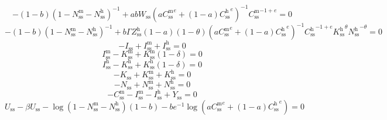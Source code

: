 \begin{equation}
-\left(1 - b\right) \left(1 - N^{\mathrm{m}}_\mathrm{ss} - N^{\mathrm{h}}_\mathrm{ss}\right)^{-1} + {a} {b} {W_\mathrm{ss}} \left({a} {{C^{\mathrm{m}}_\mathrm{ss}}^{e}} + \left(1 - a\right) {{C^{\mathrm{h}}_\mathrm{ss}}^{e}}\right)^{-1} {{C^{\mathrm{m}}_\mathrm{ss}}^{-1 + e}} = 0
\end{equation}
\begin{equation}
-\left(1 - b\right) \left(1 - N^{\mathrm{m}}_\mathrm{ss} - N^{\mathrm{h}}_\mathrm{ss}\right)^{-1} + {b} {\Gamma} {Z^{\mathrm{h}}_\mathrm{ss}} \left(1 - a\right) \left(1 - \theta\right) \left({a} {{C^{\mathrm{m}}_\mathrm{ss}}^{e}} + \left(1 - a\right) {{C^{\mathrm{h}}_\mathrm{ss}}^{e}}\right)^{-1} {{C^{\mathrm{h}}_\mathrm{ss}}^{-1 + e}} {{K^{\mathrm{h}}_\mathrm{ss}}^{\theta}} {{N^{\mathrm{h}}_\mathrm{ss}}^{-\theta}} = 0
\end{equation}
\begin{equation}
-I_\mathrm{ss} + I^{\mathrm{m}}_\mathrm{ss} + I^{\mathrm{h}}_\mathrm{ss} = 0
\end{equation}
\begin{equation}
I^{\mathrm{m}}_\mathrm{ss} - K^{\mathrm{m}}_\mathrm{ss} + {K^{\mathrm{m}}_\mathrm{ss}} \left(1 - \delta\right) = 0
\end{equation}
\begin{equation}
I^{\mathrm{h}}_\mathrm{ss} - K^{\mathrm{h}}_\mathrm{ss} + {K^{\mathrm{h}}_\mathrm{ss}} \left(1 - \delta\right) = 0
\end{equation}
\begin{equation}
-K_\mathrm{ss} + K^{\mathrm{m}}_\mathrm{ss} + K^{\mathrm{h}}_\mathrm{ss} = 0
\end{equation}
\begin{equation}
-N_\mathrm{ss} + N^{\mathrm{m}}_\mathrm{ss} + N^{\mathrm{h}}_\mathrm{ss} = 0
\end{equation}
\begin{equation}
-C^{\mathrm{m}}_\mathrm{ss} - I^{\mathrm{m}}_\mathrm{ss} - I^{\mathrm{h}}_\mathrm{ss} + Y_\mathrm{ss} = 0
\end{equation}
\begin{equation}
U_\mathrm{ss} - {\beta} {U_\mathrm{ss}} - {\log\left(1 - N^{\mathrm{m}}_\mathrm{ss} - N^{\mathrm{h}}_\mathrm{ss}\right)} \left(1 - b\right) - {b} {e}^{-1} {\log\left({a} {{C^{\mathrm{m}}_\mathrm{ss}}^{e}} + \left(1 - a\right) {{C^{\mathrm{h}}_\mathrm{ss}}^{e}}\right)} = 0
\end{equation}






